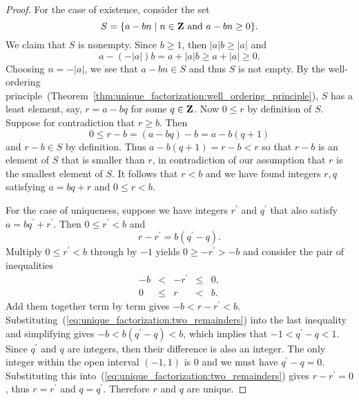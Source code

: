 \begin{proof}
For the case of existence, consider the set
\[
S
=
\{a - bn \;|\; n \in \mathbf{Z} \text{ and } a - bn \geq 0 \}.
\]
We claim that $S$ is nonempty. Since $b \geq 1$, then $|a|b \geq |a|$
and
\[
a - (-|a|)b
=
a + |a|b \geq a + |a| \geq 0.
\]
Choosing $n = -|a|$, we see that $a - bn \in S$ and thus $S$ is not
empty. By the well-ordering
principle~(Theorem~\ref{thm:unique_factorization:well_ordering_principle}),
$S$ has a least element, say, $r = a - bq$ for some $q \in \mathbf{Z}$. Now
$0 \leq r$ by definition of $S$. Suppose for contradiction that
$r \geq b$. Then
\[
0 \leq r - b = (a - bq) - b = a - b(q + 1)
\]
and $r - b \in S$ by definition. Thus $a - b(q + 1) = r - b < r$ so
that $r - b$ is an element of $S$ that is smaller than $r$, in
contradiction of our assumption that $r$ is the smallest element of
$S$. It follows that $r < b$ and we have found integers $r,q$
satisfying $a = bq + r$ and $0 \leq r < b$.

For the case of uniqueness, suppose we have integers $r^\prime$ and
$q^\prime$ that also satisfy $a = bq^{\prime} + r^{\prime}$. Then
$0 \leq r^\prime < b$ and
%
\begin{equation}
\label{eq:unique_factorization:two_remainders}
r - r^\prime
=
b(q^\prime - q).
\end{equation}
%
Multiply $0 \leq r^\prime < b$ through by $-1$ yields $0 \geq
-r^\prime > -b$ and consider the pair of inequalities
\[
\begin{array}{rcccl}
-b &<   & -r^\prime &\leq & 0, \\
0 &\leq & r         &<    & b.
\end{array}
\]
Add them together term by term gives $-b < r - r^\prime < b$.
Substituting~(\ref{eq:unique_factorization:two_remainders}) into the
last inequality and simplifying gives $-b < b(q^\prime - q) < b$,
which implies that $-1 < q^\prime - q < 1$. Since $q^\prime$ and $q$
are integers, then their difference is also an integer. The only
integer within the open interval $(-1, 1)$ is 0 and we must have
$q^\prime - q = 0$. Substituting this
into~(\ref{eq:unique_factorization:two_remainders}) gives
$r - r^\prime = 0$, thus $r = r^\prime$ and $q = q^\prime$. Therefore
$r$ and $q$ are unique.
\end{proof}



